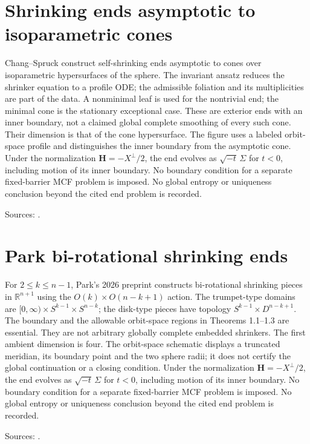 \chapter{Shrinking ends asymptotic to isoparametric cones}\label{sec:catalogue-isoparametric-shrinking-ends}
\begin{example}\label{ex:catalogue-isoparametric-shrinking-ends}
Chang--Spruck construct self-shrinking ends asymptotic to cones over isoparametric hypersurfaces of the sphere. The invariant ansatz reduces the shrinker equation to a profile ODE; the admissible foliation and its multiplicities are part of the data. A nonminimal leaf is used for the nontrivial end; the minimal cone is the stationary exceptional case. These are exterior ends with an inner boundary, not a claimed global complete smoothing of every such cone. Their dimension is that of the cone hypersurface. The figure uses a labeled orbit-space profile and distinguishes the inner boundary from the asymptotic cone. Under the normalization $\mathbf H=-X^\perp/2$, the end evolves as $\sqrt{-t}\,\Sigma$ for $t<0$, including motion of its inner boundary. No boundary condition for a separate fixed-barrier MCF problem is imposed. No global entropy or uniqueness conclusion beyond the cited end problem is recorded.
\par Sources: \cite{CatChangSpruck2017}.
\end{example}

\chapter{Park bi-rotational shrinking ends}\label{sec:catalogue-park-birotational-ends}
\begin{example}\label{ex:catalogue-park-birotational-ends}
For $2\le k\le n-1$, Park's 2026 preprint constructs bi-rotational shrinking pieces in $\mathbb R^{n+1}$ using the $O(k)\times O(n-k+1)$ action. The trumpet-type domains are $[0,\infty)\times S^{k-1}\times S^{n-k}$; the disk-type pieces have topology $S^{k-1}\times D^{n-k+1}$. The boundary and the allowable orbit-space regions in Theorems 1.1–1.3 are essential. They are not arbitrary globally complete embedded shrinkers. The first ambient dimension is four. The orbit-space schematic displays a truncated meridian, its boundary point and the two sphere radii; it does not certify the global continuation or a closing condition. Under the normalization $\mathbf H=-X^\perp/2$, the end evolves as $\sqrt{-t}\,\Sigma$ for $t<0$, including motion of its inner boundary. No boundary condition for a separate fixed-barrier MCF problem is imposed. No global entropy or uniqueness conclusion beyond the cited end problem is recorded.
\par Sources: \cite{CatPark2026}.
\end{example}

